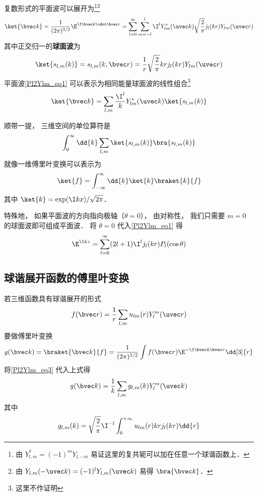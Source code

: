

复数形式的平面波可以展开为\footnote{由 $Y_{l,m}^* = (-1)^m Y_{l,-m}$ 易证这里的复共轭可以加在任意一个球谐函数上．}\footnote{由 $Y_{l,m}(-\uvec k) = (-1)^l Y_{l,m}(\uvec k)$ 易得 $\bra{\bvec k}$．}
\begin{equation}\label{Pl2Ylm_eq1}
\ket{\bvec k} = \frac{1}{(2\pi)^{3/2}}\E^{\I \bvec k \vdot \bvec r} = \sum_{l=0}^{\infty} \sum_{m=-l}^l \I^l Y_{lm}^*(\uvec k) \sqrt{\frac{2}{\pi}} j_l(kr) Y_{lm}(\uvec r)
\end{equation}
其中正交归一的\textbf{球面波}为
\begin{equation}
\ket{s_{l,m}(k)} = s_{l,m}(k,\bvec r) = \frac{1}{r}\sqrt{\frac{2}{\pi}}kr j_l(kr) Y_{lm}(\uvec r)
\end{equation}
平面波\autoref{Pl2Ylm_eq1} 可以表示为相同能量球面波的线性组合\footnote{这里不作证明}
\begin{equation}\label{Pl2Ylm_eq3}
\ket{\bvec k} = \sum_{l,m}\frac{\I^l}{k} Y_{lm}^*(\uvec k)\ket{s_{l,m}(k)} 
\end{equation}

顺带一提， 三维空间的单位算符是
\begin{equation}
\int_0^\infty \dd{k} \sum_{l,m} \ket{s_{l,m}(k)}\bra{s_{l,m}(k)}
\end{equation}
就像一维傅里叶变换可以表示为%
\begin{equation}
\ket{f} = \int_{-\infty}^{\infty} \dd{k} \ket{k}\braket{k}{f}
\end{equation}
其中 $\ket{k} = \exp(\I kx)/\sqrt{2\pi}$．

特殊地， 如果平面波的方向指向极轴（$\theta = 0$）， 由对称性， 我们只需要 $m = 0$ 的球面波即可组成平面波． 将 $\theta = 0$ 代入\autoref{Pl2Ylm_eq1} 得
\begin{equation}
\E^{\I kz} = \sum_{l=0}^\infty (2l+1) \I^l j_l(kr) P_l(\cos\theta)
\end{equation}

\subsection{球谐展开函数的傅里叶变换}

若三维函数具有球谐展开的形式
\begin{equation}
f(\bvec r) = \frac{1}{r}\sum_{l,m} u_{lm}(r) Y_l^m(\uvec r)
\end{equation}
要做傅里叶变换
\begin{equation}
g(\bvec k) = \braket{\bvec k}{f} =  \frac{1}{(2\pi)^{3/2}} \int f(\bvec r) \E^{-\I \bvec k \bvec r} \dd[3]{r}
\end{equation}
将\autoref{Pl2Ylm_eq3} 代入上式得
\begin{equation}
g(\bvec k) = \frac{1}{k} \sum_{l,m} g_{l,m}(k)  Y_l^m(\uvec k) 
\end{equation}
其中
\begin{equation}
g_{l,m}(k) = \sqrt{\frac{2}{\pi}} \I^{-l} \int_0^{+\infty} u_{lm}(r) kr j_l(kr) \dd{r}
\end{equation}

